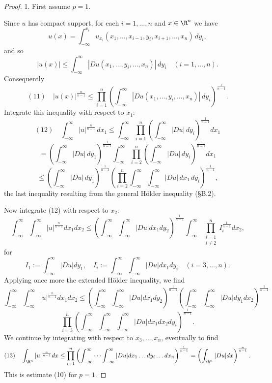 \begin{proof}
1. First assume $p = 1$.

Since $u$ has compact support, for each $i = 1,\ldots,n$ and $x \in \R^n$ we have
$$u(x) = \int_{-\infty}^{x_i} u_{x_i}(x_1,\ldots,x_{i-1},y_i,x_{i+1},\ldots,x_n)\,dy_i,$$
and so
$$|u(x)| \le \int_{-\infty}^{\infty} |Du(x_1,\ldots,y_i,\ldots,x_n)|\,dy_i \quad (i=1,\ldots,n).$$
Consequently
$$(11) \quad |u(x)|^{\frac{n}{n-1}} \le \prod_{i=1}^n \left(\int_{-\infty}^\infty |Du(x_1,\ldots,y_i,\ldots,x_n)|\,dy_i\right)^{\frac{1}{n-1}}.$$
Integrate this inequality with respect to $x_1$:
$$(12) \quad \int_{-\infty}^\infty |u|^{\frac{n}{n-1}}\,dx_1 \le \int_{-\infty}^\infty \prod_{i=1}^n \left(\int_{-\infty}^\infty |Du|\,dy_i\right)^{\frac{1}{n-1}} dx_1$$
$$= \left(\int_{-\infty}^\infty |Du|\,dy_1\right)^{\frac{1}{n-1}} \int_{-\infty}^\infty \prod_{i=2}^n \left(\int_{-\infty}^\infty |Du|\,dy_i\right)^{\frac{1}{n-1}} dx_1$$
$$\le \left(\int_{-\infty}^\infty |Du|\,dy_1\right)^{\frac{1}{n-1}} \left(\prod_{i=2}^n \int_{-\infty}^\infty \int_{-\infty}^\infty |Du|\,dx_1\,dy_i\right)^{\frac{1}{n-1}},$$
the last inequality resulting from the general Hölder inequality (§B.2).

Now integrate (12) with respect to $x_2$:
$$\int_{-\infty}^{\infty} \int_{-\infty}^{\infty} |u|^{\frac{n}{n-1}} dx_1 dx_2 \le \left(\int_{-\infty}^{\infty} \int_{-\infty}^{\infty} |Du| dx_1 dy_2\right)^{\frac{1}{n-1}} \int_{-\infty}^{\infty} \prod_{\substack{i=1 \\ i \ne 2}}^{n} I_i^{\frac{1}{n-1}} dx_2,$$
for
$$I_1 := \int_{-\infty}^{\infty} |Du| dy_1, \quad I_i := \int_{-\infty}^{\infty} \int_{-\infty}^{\infty} |Du| dx_1 dy_i \quad (i = 3, \ldots, n).$$
Applying once more the extended Hölder inequality, we find
$$\int_{-\infty}^{\infty} \int_{-\infty}^{\infty} |u|^{\frac{n}{n-1}} dx_1 dx_2 \le \left(\int_{-\infty}^{\infty} \int_{-\infty}^{\infty} |Du| dx_1 dy_2\right)^{\frac{1}{n-1}} \left(\int_{-\infty}^{\infty} \int_{-\infty}^{\infty} |Du| dy_1 dx_2\right)^{\frac{1}{n-1}}$$
$$\prod_{i=3}^{n} \left(\int_{-\infty}^{\infty} \int_{-\infty}^{\infty} \int_{-\infty}^{\infty} |Du| dx_1 dx_2 dy_i\right)^{\frac{1}{n-1}}.$$
We continue by integrating with respect to $x_3, \ldots, x_n$, eventually to find
$$(13) \quad \int_{\R^n} |u|^{\frac{n}{n-1}} dx \le \prod_{i=1}^{n} \left(\int_{-\infty}^{\infty} \cdots \int_{-\infty}^{\infty} |Du| dx_1 \ldots dy_i \ldots dx_n\right)^{\frac{1}{n-1}} = \left(\int_{\R^n} |Du| dx\right)^{\frac{n}{n-1}}.$$
This is estimate (10) for $p = 1$.


\end{proof}
